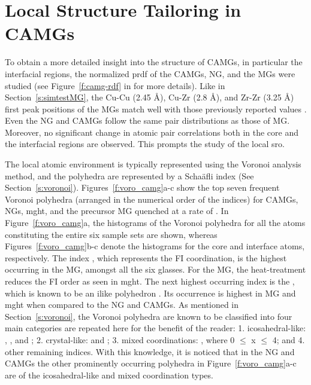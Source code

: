 \section{Local Structure Tailoring in CAMGs}
\begin{changebar}
To obtain a more detailed insight into the structure of CAMGs, in particular the interfacial regions, the normalized \gls{prdf} of the CAMGs, NG, and the MGs were studied (see Figure~\ref{f:camg-rdf} in  for more details). Like in Section~\ref{s:simtestMG}, the Cu-Cu (2.45 \r{A}), Cu-Zr (2.8 \r{A}), and Zr-Zr (3.25 \r{A}) first peak positions of the MGs match well with those previously reported values \cite{Nasu2007,Duan2005}. Even the NG and CAMGs follow the same pair distributions as those of MG. Moreover, no significant change in atomic pair correlations both in the core and the interfacial regions are observed. This prompts the study of the local \gls{sro}. \par

The local atomic environment is typically represented using the Voronoi analysis method, and the polyhedra are represented by a   Scha\"afli index (See Section~\ref{s:voronoi}). Figures~\ref{f:voro_camg}a-c show the top seven frequent Voronoi polyhedra (arranged in the numerical order of the indices) for CAMGs, NGs, \gls{mght}, and the precursor MG quenched at a rate of . In Figure~\ref{f:voro_camg}a, the histograms of the Voronoi polyhedra for all the atoms constituting the entire six sample sets are shown, whereas Figures~\ref{f:voro_camg}b-c denote the histograms for the core and interface atoms, respectively. The index , which represents the FI coordination, is the highest occurring in the MG, amongst all the six glasses. For the  MG, the heat-treatment reduces the FI order as seen in \gls{mght}. The next highest occurring index is the , which is known to be an \gls{ilike} polyhedron \cite{Yue2018,Borodin1999}. Its occurrence is highest in MG and \gls{mght} when compared to the NG and CAMGs. As mentioned in Section~\ref{s:voronoi}, the Voronoi polyhedra are known to be classified into four main categories \cite{Yue2018} are repeated here for the benefit of the reader: 1. icosahedral-like: , , and ; 2. crystal-like:  and ; 3. mixed coordinations: , where 0 $\leq$ x $\leq$ 4; and 4. other remaining indices. With this knowledge, it is noticed that in the NG and CAMGs the other prominently occurring polyhedra in Figure~\ref{f:voro_camg}a-c are of the icosahedral-like and mixed coordination types. \par


\end{changebar}
